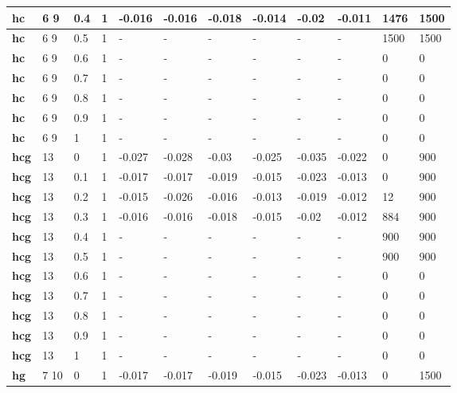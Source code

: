 \begin{table}[h]
\begin{tabular}[h]{|l|l|l|l|l|l|l|l|l|l|l|l|
    }
    \\ \hline
  \textbf{hc  } & 6 9        & 0.4 & 1 & -0.016 & -0.016 & -0.018 & -0.014 &  -0.02 & -0.011 & 1476 & 1500
    \\ \hline
  \textbf{hc  } & 6 9        & 0.5 & 1 & - & - & - & - & - & - & 1500 & 1500
    \\ \hline
  \textbf{hc  } & 6 9        & 0.6 & 1 & - & - & - & - & - & - &    0 &    0
    \\ \hline
  \textbf{hc  } & 6 9        & 0.7 & 1 & - & - & - & - & - & - &    0 &    0
    \\ \hline
  \textbf{hc  } & 6 9        & 0.8 & 1 & - & - & - & - & - & - &    0 &    0
    \\ \hline
  \textbf{hc  } & 6 9        & 0.9 & 1 & - & - & - & - & - & - &    0 &    0
    \\ \hline
  \textbf{hc  } & 6 9        &   1 & 1 & - & - & - & - & - & - &    0 &    0
    \\ \hline
  \textbf{hcg } & 13         &   0 & 1 & -0.027 & -0.028 &  -0.03 & -0.025 & -0.035 & -0.022 &    0 &  900
    \\ \hline
  \textbf{hcg } & 13         & 0.1 & 1 & -0.017 & -0.017 & -0.019 & -0.015 & -0.023 & -0.013 &    0 &  900
    \\ \hline
  \textbf{hcg } & 13         & 0.2 & 1 & -0.015 & -0.026 & -0.016 & -0.013 & -0.019 & -0.012 &   12 &  900
    \\ \hline
  \textbf{hcg } & 13         & 0.3 & 1 & -0.016 & -0.016 & -0.018 & -0.015 &  -0.02 & -0.012 &  884 &  900
    \\ \hline
  \textbf{hcg } & 13         & 0.4 & 1 & - & - & - & - & - & - &  900 &  900
    \\ \hline
  \textbf{hcg } & 13         & 0.5 & 1 & - & - & - & - & - & - &  900 &  900
    \\ \hline
  \textbf{hcg } & 13         & 0.6 & 1 & - & - & - & - & - & - &    0 &    0
    \\ \hline
  \textbf{hcg } & 13         & 0.7 & 1 & - & - & - & - & - & - &    0 &    0
    \\ \hline
  \textbf{hcg } & 13         & 0.8 & 1 & - & - & - & - & - & - &    0 &    0
    \\ \hline
  \textbf{hcg } & 13         & 0.9 & 1 & - & - & - & - & - & - &    0 &    0
    \\ \hline
  \textbf{hcg } & 13         &   1 & 1 & - & - & - & - & - & - &    0 &    0
    \\ \hline
  \textbf{hg  } & 7 10       &   0 & 1 & -0.017 & -0.017 & -0.019 & -0.015 & -0.023 & -0.013 &    0 & 1500

\end{tabular}
\end{table}
